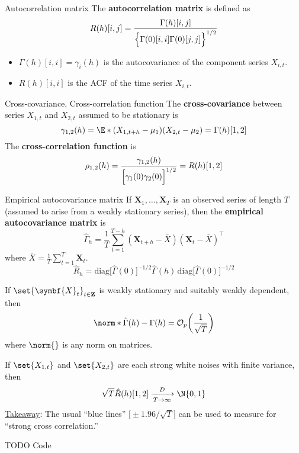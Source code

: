 \begin{Definition}{Autocorrelation matrix}{}
    The \textbf{autocorrelation matrix} is defined as
    \[ R(h)[i,j]=\frac{\Gamma(h)[i,j]}{\Bigl\{\Gamma(0)[i,i]\Gamma(0)[j,j]\Bigr\}^{1/2}}  \]
\end{Definition}
\begin{Remark}{}{}
    \begin{itemize}
        \item $ \Gamma(h)[i,i]=\gamma_i(h) $ is the autocovariance of the component
              series $ X_{i,t} $.
        \item $ R(h)[i,i] $ is the ACF of the time series $ X_{i,t} $.
    \end{itemize}
\end{Remark}
\begin{Definition}{Cross-covariance, Cross-correlation function}{}
    The \textbf{cross-covariance} between series $ X_{1,t} $ and $ X_{2,t} $
    assumed to be stationary is
    \[ \gamma_{1,2}(h)=\E*{(X_{1,t+h}-\mu_1)(X_{2,t}-\mu_2)}=\Gamma(h)[1,2] \]
    The \textbf{cross-correlation function} is
    \[ \rho_{1,2}(h)=\frac{\gamma_{1,2}(h)}{\Bigl[\gamma_1(0)\gamma_2(0)\Bigr]^{1/2}}=R(h)[1,2]  \]
\end{Definition}
\begin{Definition}{Empirical autocovariance matrix}{}
    If $ \symbf{X}_1,\ldots,\symbf{X}_T $ is an observed series of length $ T $
    (assumed to arise from a weakly stationary series), then the
    \textbf{empirical autocovariance matrix} is
    \[ \hat{\Gamma}_h=\frac{1}{T} \sum_{t=1}^{T-h}(\symbf{X}_{t+h}-\bar{X})(\symbf{X}_t-\bar{X})^\top  \]
    where $ \bar{X}=\frac{1}{T} \sum_{t=1}^{T} \symbf{X}_t $.
    \[ \hat{R}_h=\text{diag}\bigl[\hat{\Gamma}(0)\bigr]^{-1/2}\hat{\Gamma}(h)\, \text{diag}\bigl[\hat{\Gamma}(0)\bigr]^{-1/2} \]
\end{Definition}
\begin{Theorem}{}{}
    If $ \set{\symbf{X}_t}_{t\in\mathbf{Z}} $ is weakly stationary and suitably weakly dependent,
    then
    \[ \norm*{\hat{\Gamma}(h)-\Gamma(h)}=\mathcal{O}_p\biggl(\frac{1}{\sqrt{T}}\biggr) \]
    where $ \norm{} $ is any norm on matrices.

    If $ \set{X_{1,t}} $ and $ \set{X_{2,t}} $ are each strong white noises with finite variance,
    then
    \[ \sqrt{T}\hat{R}(h)[1,2]\xrightarrow[T\to\infty]{D}\N{0,1} \]
    \underline{Takeaway}: The usual ``blue lines'' $ \bigl[\pm 1.96/\sqrt{T}\bigr] $
    can be used to measure for ``strong cross correlation.''
\end{Theorem}
TODO Code
